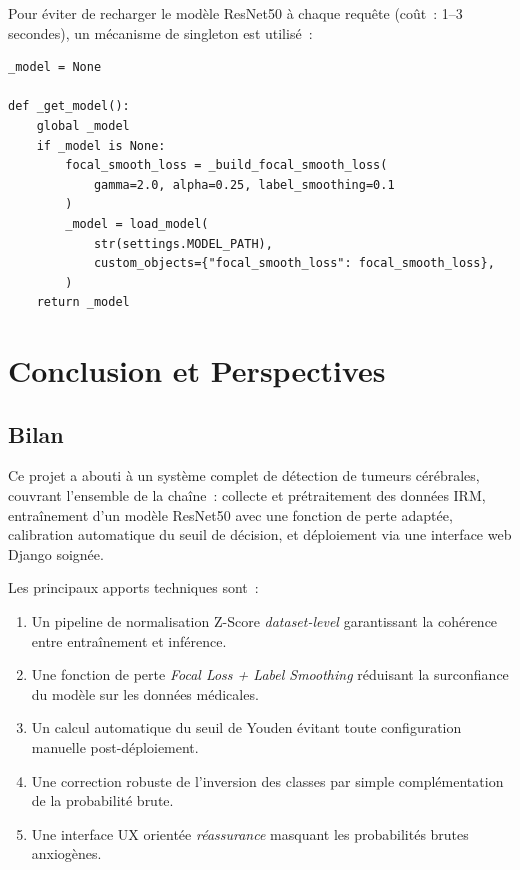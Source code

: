 \documentclass[12pt, a4paper]{report}
\begin{document}
Pour éviter de recharger le modèle ResNet50 à chaque requête
(coût~: 1–3 secondes), un mécanisme de singleton est utilisé~:

\begin{lstlisting}[caption={Singleton de chargement du modèle (views.py)},
                   label={lst:lazy_load}]
_model = None

def _get_model():
    global _model
    if _model is None:
        focal_smooth_loss = _build_focal_smooth_loss(
            gamma=2.0, alpha=0.25, label_smoothing=0.1
        )
        _model = load_model(
            str(settings.MODEL_PATH),
            custom_objects={"focal_smooth_loss": focal_smooth_loss},
        )
    return _model
\end{lstlisting}

\chapter{Conclusion et Perspectives}
\label{chap:conclusion}

\section{Bilan}

Ce projet a abouti à un système complet de détection de tumeurs
cérébrales, couvrant l'ensemble de la chaîne~: collecte et prétraitement
des données IRM, entraînement d'un modèle ResNet50 avec une fonction de
perte adaptée, calibration automatique du seuil de décision, et
déploiement via une interface web Django soignée.

Les principaux apports techniques sont~:

\begin{enumerate}
  \item Un pipeline de normalisation Z-Score \textit{dataset-level}
        garantissant la cohérence entre entraînement et inférence.
  \item Une fonction de perte \textit{Focal Loss + Label Smoothing}
        réduisant la surconfiance du modèle sur les données médicales.
  \item Un calcul automatique du seuil de Youden évitant toute
        configuration manuelle post-déploiement.
  \item Une correction robuste de l'inversion des classes par simple
        complémentation de la probabilité brute.
  \item Une interface UX orientée \textit{réassurance} masquant les
        probabilités brutes anxiogènes.
\end{enumerate}
\end{document}
